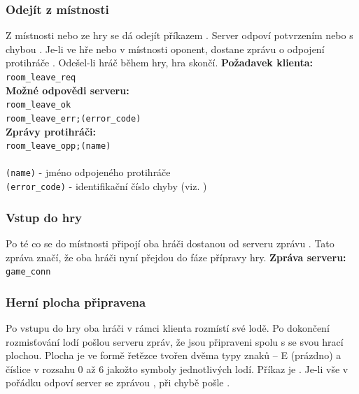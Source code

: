 \documentclass[12pt, a4paper]{article} %
\begin{document}
	\subsubsection{Odejít z místnosti}
	\par Z místnosti nebo ze hry se dá odejít příkazem . Server odpoví potvrzením nebo s chybou .
	Je-li ve hře nebo v místnosti oponent, dostane zprávu o odpojení protihráče . Odešel-li hráč během hry, hra skončí.	
	\textbf{Požadavek klienta:}\\
	\texttt{room\_leave\_req}\\
	\textbf{Možné odpovědi serveru:}\\
	\texttt{room\_leave\_ok}\\
	\texttt{room\_leave\_err;(error\_code)}\\
	\textbf{Zprávy protihráči:}\\
	\texttt{room\_leave\_opp;(name)}\\\\
	\texttt{(name)} - jméno odpojeného protihráče\\
	\texttt{(error\_code)} - identifikační číslo chyby (viz. )
	\subsubsection{Vstup do hry}
	\par Po té co se do místnosti připojí oba hráči dostanou od serveru zprávu . Tato zpráva značí, že oba hráči nyní přejdou do fáze přípravy hry.
	\textbf{Zpráva serveru:}\\
	\texttt{game\_conn}\\
	
	\subsubsection{Herní plocha připravena}
	\label{ssec:game_ready}
	\par Po vstupu do hry oba hráči v rámci klienta rozmístí své lodě. Po dokončení rozmisťování lodí pošlou serveru zpráv, že jsou připraveni spolu s se svou hrací plochou. Plocha je ve formě řetězce tvořen dvěma typy znaků – E (prázdno) a číslice v rozsahu 0 až 6 jakožto symboly jednotlivých lodí. Příkaz je .  Je-li vše v pořádku odpoví server se zprávou , při chybě pošle .
	
\end{document}
